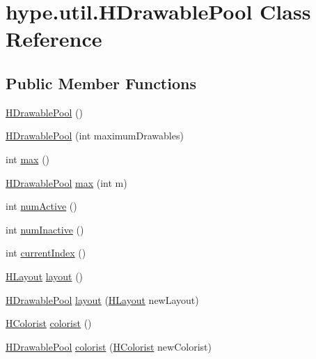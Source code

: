 \hypertarget{classhype_1_1util_1_1_h_drawable_pool}{\section{hype.\-util.\-H\-Drawable\-Pool Class Reference}
\label{classhype_1_1util_1_1_h_drawable_pool}
}
\subsection*{Public Member Functions}
\begin{DoxyCompactItemize}
\item 
\hyperlink{classhype_1_1util_1_1_h_drawable_pool_a69d54e92e33ec6c26afbf9540dcd9974}{H\-Drawable\-Pool} ()
\item 
\hyperlink{classhype_1_1util_1_1_h_drawable_pool_a3b9a711d1669d793c5fb5c96e128da1e}{H\-Drawable\-Pool} (int maximum\-Drawables)
\item 
int \hyperlink{classhype_1_1util_1_1_h_drawable_pool_adf9a249ec417c762022a43a0b0910013}{max} ()
\item 
\hyperlink{classhype_1_1util_1_1_h_drawable_pool}{H\-Drawable\-Pool} \hyperlink{classhype_1_1util_1_1_h_drawable_pool_a4f43c0a1c4f961661ea3e1863be636c1}{max} (int m)
\item 
int \hyperlink{classhype_1_1util_1_1_h_drawable_pool_aeb085fa401c9e9aeaa526a48e90f757b}{num\-Active} ()
\item 
int \hyperlink{classhype_1_1util_1_1_h_drawable_pool_a4470a068f3167c810b038a61ea4e97ff}{num\-Inactive} ()
\item 
int \hyperlink{classhype_1_1util_1_1_h_drawable_pool_a82f0c3a5068f6a88ba1e21a2312bb1fe}{current\-Index} ()
\item 
\hyperlink{interfacehype_1_1layout_1_1_h_layout}{H\-Layout} \hyperlink{classhype_1_1util_1_1_h_drawable_pool_aded3dc9c7e64da63adff672e780d920d}{layout} ()
\item 
\hyperlink{classhype_1_1util_1_1_h_drawable_pool}{H\-Drawable\-Pool} \hyperlink{classhype_1_1util_1_1_h_drawable_pool_a9547e82e5d55a1137f60f2238ed361b5}{layout} (\hyperlink{interfacehype_1_1layout_1_1_h_layout}{H\-Layout} new\-Layout)
\item 
\hyperlink{interfacehype_1_1colorist_1_1_h_colorist}{H\-Colorist} \hyperlink{classhype_1_1util_1_1_h_drawable_pool_ad6392eb93c82c0f84793dc94da598070}{colorist} ()
\item 
\hyperlink{classhype_1_1util_1_1_h_drawable_pool}{H\-Drawable\-Pool} \hyperlink{classhype_1_1util_1_1_h_drawable_pool_af1a34fd7a8507f25bc23823f302d0fd9}{colorist} (\hyperlink{interfacehype_1_1colorist_1_1_h_colorist}{H\-Colorist} new\-Colorist)

\end{DoxyCompactItemize}
